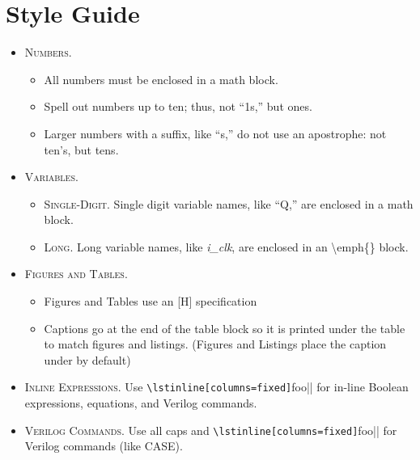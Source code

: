 \chapter*{Style Guide}
\thispagestyle{empty}

\begin{itemize}

  \item \textsc{Numbers}. 
  
  \begin{itemize}
    \item All numbers must be enclosed in a math block.
    \item Spell out numbers up to ten; thus, not ``1s,'' but ones.
    \item Larger numbers with a suffix, like ``s,'' do not use an apostrophe: not ten's, but tens.
  \end{itemize}

  \item \textsc{Variables}. 
  
  \begin{itemize}
    \item \textsc{Single-Digit}. Single digit variable names, like ``Q,'' are enclosed in a math block.
    \item \textsc{Long}. Long variable names, like \emph{i\_clk}, are enclosed in an \textbackslash emph\{\} block.
  \end{itemize}

  \item \textsc{Figures and Tables}.
  
  \begin{itemize}
    \item Figures and Tables use an [H] specification
    \item Captions go at the end of the table block so it is printed under the table to match figures and listings. (Figures and Listings place the caption under by default)
  \end{itemize}
  
  \item \textsc{Inline Expressions}. Use \lstinline[columns=fixed]|\lstinline[columns=fixed]|foo|| for in-line Boolean expressions, equations, and Verilog commands.

  \item \textsc{Verilog Commands}. Use all caps and  \lstinline[columns=fixed]|\lstinline[columns=fixed]|foo|| for Verilog commands (like CASE).


\end{itemize}
